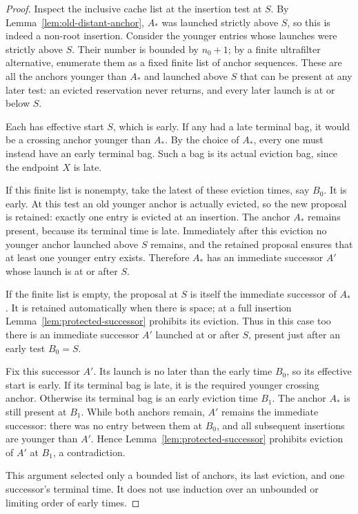 \begin{proof}
Inspect the inclusive cache list at the insertion test at $S$.
By Lemma~\ref{lem:old-distant-anchor}, $A_*$ was launched strictly
above $S$, so this is indeed a non-root insertion.  Consider the
younger entries whose launches were strictly above $S$.  Their number
is bounded by $n_0+1$; by a finite ultrafilter alternative, enumerate
them as a fixed finite list of anchor sequences.
These are all the anchors younger than $A_*$ and launched above $S$
that can be present at any later test: an evicted reservation never
returns, and every later launch is at or below $S$.

Each has effective start $S$, which is early.  If any had a late terminal
bag, it would be a crossing anchor younger than $A_*$.  By the choice
of $A_*$, every one must instead have an early terminal bag.  Such a bag
is its actual eviction bag, since the endpoint $X$ is late.

If this finite list is nonempty, take the latest of these eviction
times, say $B_0$.  It is early.  At this test an old younger anchor is
actually evicted, so the new proposal is retained: exactly one entry
is evicted at an insertion.  The anchor $A_*$ remains present, because
its terminal time is late.  Immediately after this eviction no younger
anchor launched above $S$ remains, and the retained proposal ensures
that at least one younger entry exists.  Therefore $A_*$ has an
immediate successor $A'$ whose launch is at or after $S$.

If the finite list is empty, the proposal at $S$ is itself the immediate
successor of $A_*$.  It is retained automatically when there is space;
at a full insertion Lemma~\ref{lem:protected-successor} prohibits its
eviction.  Thus in this case too there is an immediate successor $A'$
launched at or after $S$, present just after an early test $B_0=S$.

Fix this successor $A'$.  Its launch is no later than the early time
$B_0$, so its effective start is early.  If its terminal bag is late,
it is the required younger crossing anchor.  Otherwise its terminal
bag is an early eviction time $B_1$.  The anchor $A_*$ is still present
at $B_1$.  While both anchors remain, $A'$ remains the immediate
successor: there was no entry between them at $B_0$, and all subsequent
insertions are younger than $A'$.  Hence
Lemma~\ref{lem:protected-successor} prohibits eviction of $A'$ at
$B_1$, a contradiction.

This argument selected only a bounded list of anchors, its last
eviction, and one successor's terminal time.  It does not use induction
over an unbounded or limiting order of early times.
\end{proof}

